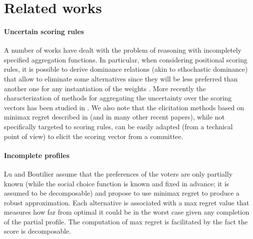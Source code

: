 \documentclass[12pt]{article}
\newcommand{\ppref}{\succ^\text{p}}%
\DeclareMathOperator{\PMR}{PMR}
\DeclareMathOperator{\MR}{MR}
\DeclareMathOperator{\MMR}{MMR}
\begin{document}
\section*{Related works}

\paragraph{Uncertain scoring rules}
A number of works have dealt with the problem of reasoning with incompletely specified aggregation functions.
In particular, when considering positional scoring rules, it is possible to derive dominance relations (akin to sthochastic dominance) that allow to eliminate some alternatives since they will be less preferred than another one for any instantiation of the weights \cite{Stein1994}.
More recently the characterization of methods for aggregating the uncertainty over the scoring vectors has been studied in \cite{Viappiani2018}.
We also note that the elicitation methods based on minimax regret described in \cite{Boutilier2006} (and in many other recent papers), while not specifically targeted to scoring rules, can be easily adapted (from a technical point of view) to elicit the scoring vector from a committee.

\paragraph{Incomplete profiles}

Lu and Boutilier \cite{Lu2011} assume that the preferences of the voters are only partially known (while the social choice function is known and fixed in advance; it is assumed to be decomposable) and 
 propose to use minimax regret to produce a robust approximation.
Each alternative is associated with a max regret value that measures how far from optimal it could be in the worst case given any completion of the partial profile.
The computation of max regret is facilitated by the fact the score is decomposable.
% 
\end{document}
